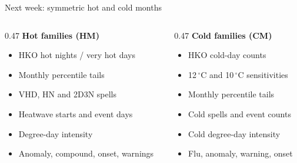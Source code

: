 \begin{frame}{Next week: symmetric hot and cold months}
  \footnotesize
  \begin{columns}[T]
    \begin{column}{0.47\textwidth}
      {\color{LaidlawTeal}\textbf{Hot families (HM)}}
      \begin{itemize}
        \item HKO hot nights / very hot days
        \item Monthly percentile tails
        \item VHD, HN and 2D3N spells
        \item Heatwave starts and event days
        \item Degree-day intensity
        \item Anomaly, compound, onset, warnings
      \end{itemize}
    \end{column}
    \begin{column}{0.47\textwidth}
      {\color{LaidlawTeal}\textbf{Cold families (CM)}}
      \begin{itemize}
        \item HKO cold-day counts
        \item 12\,$^\circ$C and 10\,$^\circ$C sensitivities
        \item Monthly percentile tails
        \item Cold spells and event counts
        \item Cold degree-day intensity
        \item Flu, anomaly, warning, onset
      \end{itemize}
    \end{column}
  \end{columns}

  \vspace{0.4em}
\end{frame}

